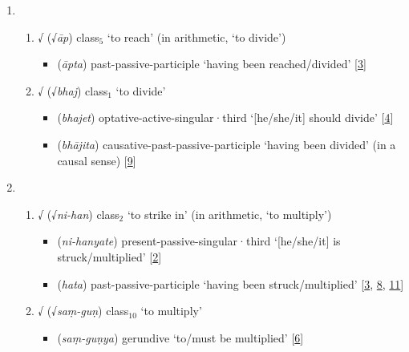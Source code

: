 \begin{enumerate}
\begin{enumerate}
\begin{itemize}
        \end{itemize}
        \end{enumerate} 
\item \begin{enumerate}
        \item √ (√\textit{āp}) \acrshort{class}$_\text{5}$ `to reach' (in arithmetic, `to divide')
        \begin{itemize}
            \item {} (\textit{āpta}) \acrshort{past}-\acrshort{passive}-\acrshort{participle} `having been reached/divided' [\hyperlink{Spass3}{3}]
        \end{itemize}
        \item  √ (√\textit{bhaj}) \acrshort{class}$_\text{1}$ `to divide'
        \begin{itemize}
            \item {} (\textit{bhajet}) \acrshort{optative}-\acrshort{active}-\acrshort{singular}·\acrshort{third} `[he/she/it] should divide' [\hyperlink{Spass4}{4}]
            \item {} (\textit{bhājita}) \acrshort{causative}-\acrshort{past}-\acrshort{passive}-\acrshort{participle} `having been divided' (in a causal sense) [\hyperlink{Spass9}{9}]
        \end{itemize}
        \end{enumerate}        
\item \begin{enumerate}
        \item √ (√\textit{ni-han}) \acrshort{class}$_\text{2}$  `to strike in' (in arithmetic, `to multiply')
        \begin{itemize}
            \item {} (\textit{ni-hanyate}) \acrshort{present}-\acrshort{passive}-\acrshort{singular}·\acrshort{third} `[he/she/it] is struck/multiplied' [\hyperlink{Spass2}{2}]
            \item {} (\textit{hata}) \acrshort{past}-\acrshort{passive}-\acrshort{participle} `having been struck/multiplied' [\hyperlink{Spass3}{3}, \hyperlink{Spass8}{8}, \hyperlink{Spass11}{11}]
        \end{itemize}
        \item √ (√\textit{saṃ-guṇ}) \acrshort{class}$_\text{10}$  `to multiply' 
        \begin{itemize}
            \item {} (\textit{saṃ-guṇya}) \acrshort{gerundive} `to/must be multiplied' [\hyperlink{Spass6}{6}]

\end{itemize}
\end{enumerate}
\end{enumerate}
